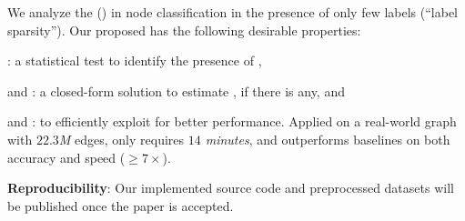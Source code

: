 


 We analyze the \neteffect (\nef) in node classification 
 in the presence of only  few labels (``label sparsity'').
Our proposed \method has the following  desirable properties:
\ben
    \item {\em \theory}: a statistical test \methodtest to identify the presence of \nef,
    \item {\em \general} and {\em \explain}: a closed-form solution \methodest to estimate \nef, if there is any, and
    \item {\em \accurate} and {\em \scale}: \methodexp to efficiently exploit \nef for better performance.
\een
Applied on a real-world graph with {\em$22.3$M} edges, \method only requires {\em $14$ minutes}, and outperforms baselines on both accuracy and speed ($\geq 7\times$).


{\bf Reproducibility}: Our implemented source code and preprocessed datasets will be published once the paper is accepted.